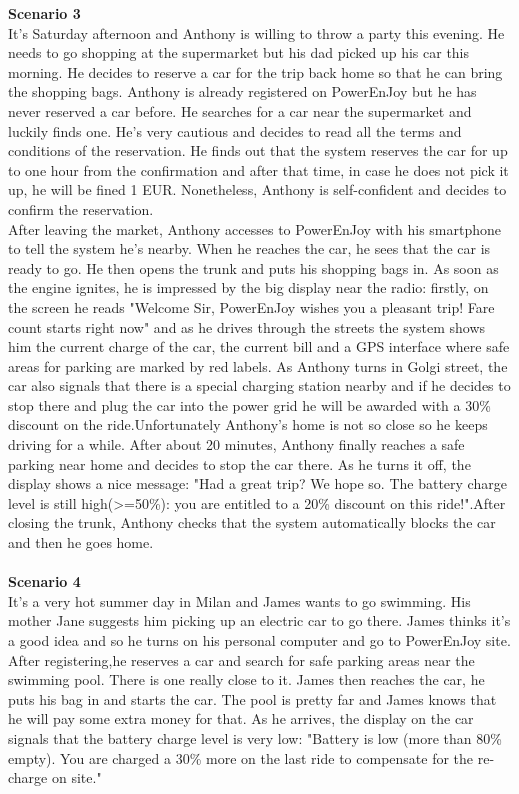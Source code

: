 \documentclass[11pt,a4paper]{report}
\begin{document}
\textbf{Scenario 3}\\
It's Saturday afternoon and Anthony is willing to throw a party this evening. He needs to go shopping at the supermarket but his dad picked up his car this morning. He decides to reserve a car for the trip back home so that he can bring the shopping bags. Anthony is already registered on PowerEnJoy but he has never reserved a car before. He searches for a car near the supermarket and luckily finds one. He's very cautious and decides to read all the terms and conditions of the reservation. He finds out that the system reserves the car for up to one hour from the confirmation and after that time, in case he does not pick it up, he will be fined 1 EUR. Nonetheless, Anthony is self-confident and decides to confirm the reservation.\\
After leaving the market, Anthony accesses to PowerEnJoy with his smartphone to tell the system he's nearby. When he reaches the car, he sees that the car is ready to go. He then opens the trunk and puts his shopping bags in. As soon as the engine ignites, he is impressed by the big display near the radio: firstly, on the screen he reads "Welcome Sir, PowerEnJoy wishes you a pleasant trip! Fare count starts right now" and as he drives through the streets the system shows him the current charge of the car, the current bill and a GPS interface where safe areas for parking are marked by red labels. As Anthony turns in Golgi street, the car also signals that there is a special charging station nearby and if he decides to stop there and plug the car into the power grid he will be awarded with a 30\% discount on the ride.Unfortunately Anthony's home is not so close so he keeps driving for a while. After about 20 minutes, Anthony finally reaches a safe parking near home and decides to stop the car there. As he turns it off, the display shows a nice message: "Had a great trip? We hope so. The battery charge level is still high(>=50\%): you are entitled to a 20\% discount on this ride!".After closing the trunk, Anthony checks that the system automatically blocks the car and then he goes home.\\ \noindent \\
\textbf{Scenario 4}\\
It's a very hot summer day in Milan and James wants to go swimming. His mother Jane suggests him picking up an electric car to go there. James thinks it's a good idea and so he turns on his personal computer and go to PowerEnJoy site. After registering,he reserves a car and search for safe parking areas near the swimming pool. There is one really close to it. James then reaches the car, he puts his bag in and starts the car. The pool is pretty far and James knows that he will pay some extra money for that. As he arrives, the display on the car signals that the battery charge level is very low: "Battery is low (more than 80\% empty). You are charged a 30\% more on the last ride to compensate for the re-charge on site."\\ 
\end{document}
